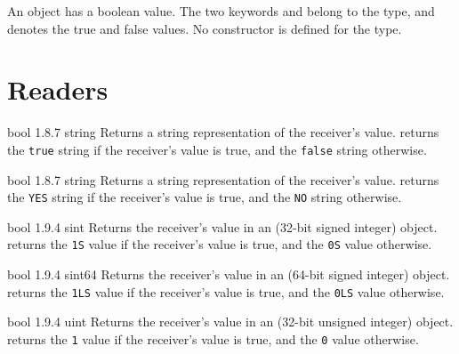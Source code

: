 

An  object has a boolean value. The two keywords  and  belong to the  type, and denotes the true and false values. No constructor is defined for the  type.

\section{Readers}

{bool}
{1.8.7}
{string}
{Returns a string representation of the receiver's value.}
{returns the \texttt{\textquotedbl true\textquotedbl} string if the receiver's value is true, and the \texttt{\textquotedbl false\textquotedbl} string otherwise.}







{bool}
{1.8.7}
{string}
{Returns a string representation of the receiver's value.}
{returns the \texttt{\textquotedbl YES\textquotedbl} string if the receiver's value is true, and the \texttt{\textquotedbl NO\textquotedbl} string otherwise.}




{bool}
{1.9.4}
{sint}
{Returns the receiver's value in an  (32-bit signed integer) object.}
{returns the \texttt{1S}  value if the receiver's value is true, and the \texttt{0S}  value otherwise.}




{bool}
{1.9.4}
{sint64}
{Returns the receiver's value in an  (64-bit signed integer) object.}
{returns the \texttt{1LS}  value if the receiver's value is true, and the \texttt{0LS}  value otherwise.}




{bool}
{1.9.4}
{uint}
{Returns the receiver's value in an  (32-bit unsigned integer) object.}
{returns the \texttt{1}  value if the receiver's value is true, and the \texttt{0}  value otherwise.}




